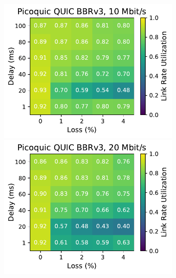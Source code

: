 \begin{figure}[ht]
\begin{subfigure}[b]{0.22\linewidth}
        \includegraphics[width=\linewidth,trim={0 0 2cm 0},clip]{splitting/figures/heatmaps/heatmap_picoquic_bbr3_10mbps.pdf}
        \includegraphics[width=\linewidth,trim={0 0 2cm 0},clip]{splitting/figures/heatmaps/heatmap_picoquic_bbr3_20mbps.pdf}

\end{subfigure}
\end{figure}
